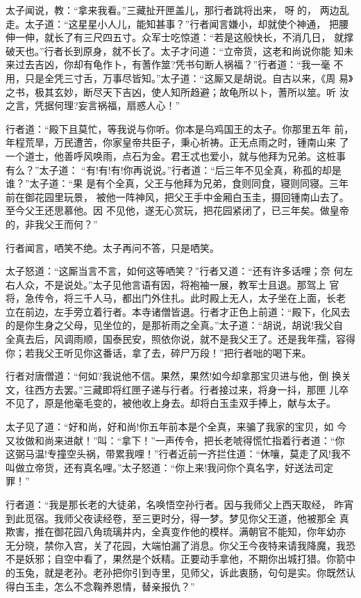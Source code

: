 太子闻说，教：“拿来我看。”三藏扯开匣盖儿，那行者跳将出来，呀的，
两边乱走。太子道：“这星星小人儿，能知甚事？”行者闻言嫌小，却就使个神通，
把腰伸一伸，就长了有三尺四五寸。众军士吃惊道：“若是这般快长，不消几日，
就撑破天也。”行者长到原身，就不长了。太子才问道：“立帝货，这老和尚说你能
知未来过去吉凶，你却有龟作卜，有蓍作筮?凭书句断人祸福？”行者道：“我一毫
不用，只是全凭三寸舌，万事尽皆知。”太子道：“这厮又是胡说。自古以来，《周
易》之书，极其玄妙，断尽天下吉凶，使人知所趋避；故龟所以卜，蓍所以筮。听
汝之言，凭据何理?妄言祸福，扇惑人心！”

行者道：“殿下且莫忙，等我说与你听。你本是乌鸡国王的太子。你那里五年
前，年程荒旱，万民遭苦，你家皇帝共臣子，秉心祈祷。正无点雨之时，锺南山来
了一个道士，他善呼风唤雨，点石为金。君王忒也爱小，就与他拜为兄弟。这桩事
有么？”太子道：
“有!有!有!你再说说。”行者道：“后三年不见全真，称孤的却是谁？”太子道：“果
是有个全真，父王与他拜为兄弟，食则同食，寝则同寝。三年前在御花园里玩景，
被他一阵神风，把父王手中金厢白玉圭，摄回锺南山去了。至今父王还思慕他。因
不见他，遂无心赏玩，把花园紧闭了，已三年矣。做皇帝的，非我父王而何？”

行者闻言，哂笑不绝。太子再问不答，只是哂笑。

太子怒道：“这厮当言不言，如何这等哂笑？”行者又道：“还有许多话哩；奈
何左右人众，不是说处。”太子见他言语有因，将袍袖一展，教军士且退。那驾上
官将，急传令，将三千人马，都出门外住扎。此时殿上无人，太子坐在上面，长老
立在前边，左手旁立着行者。本寺诸僧皆退。行者才正色上前道：“殿下，化风去
的是你生身之父母，见坐位的，是那祈雨之全真。”太子道：“胡说，胡说!我父自
全真去后，风调雨顺，国泰民安，照依你说，就不是我父王了。还是我年孺，容得
你；若我父王听见你这番话，拿了去，碎尸万段！”把行者咄的喝下来。

行者对唐僧道：“何如?我说他不信。果然，果然!如今却拿那宝贝进与他，倒
换关文，往西方去罢。”三藏即将红匣子递与行者。行者接过来，将身一抖，那匣
儿卒不见了，原是他毫毛变的，被他收上身去。却将白玉圭双手捧上，献与太子。

太子见了道：“好和尚，好和尚!你五年前本是个全真，来骗了我家的宝贝，如
今又妆做和尚来进献！”叫：“拿下！”一声传令，把长老唬得慌忙指着行者道：“你
这弼马温!专撞空头祸，带累我哩！”行者近前一齐拦住道：“休嚷，莫走了风!我不
叫做立帝货，还有真名哩。”太子怒道：“你上来!我问你个真名字，好送法司定罪！”

行者道：“我是那长老的大徒弟，名唤悟空孙行者。因与我师父上西天取经，
昨宵到此觅宿。我师父夜读经卷，至三更时分，得一梦。梦见你父王道，他被那全
真欺害，推在御花园八角琉璃井内，全真变作他的模样。满朝官不能知，你年幼亦
无分晓，禁你入宫，关了花园，大端怕漏了消息。你父王今夜特来请我降魔，我恐
不是妖邪；自空中看了，果然是个妖精。正要动手拿他，不期你出城打猎。你箭中
的玉兔，就是老孙。老孙把你引到寺里，见师父，诉此衷肠，句句是实。你既然认
得白玉圭，怎么不念鞠养恩情，替亲报仇？”

